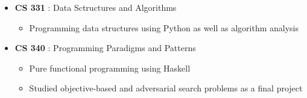\cvsection{ \phantom{Relevant Courses}}
\begin{itemize}
\item \textbf{CS 331} : Data Sctructures and Algorithms
  \begin{itemize}
  \item Programming data structures using Python as well as algorithm analysis
  \end{itemize}
\item \textbf{CS 340} : Programming Paradigms and Patterns
  \begin{itemize}
  \item Pure functional programming using Haskell
  \item Studied objective-based and adversarial search problems as a final project
  \end{itemize}
\end{itemize}
